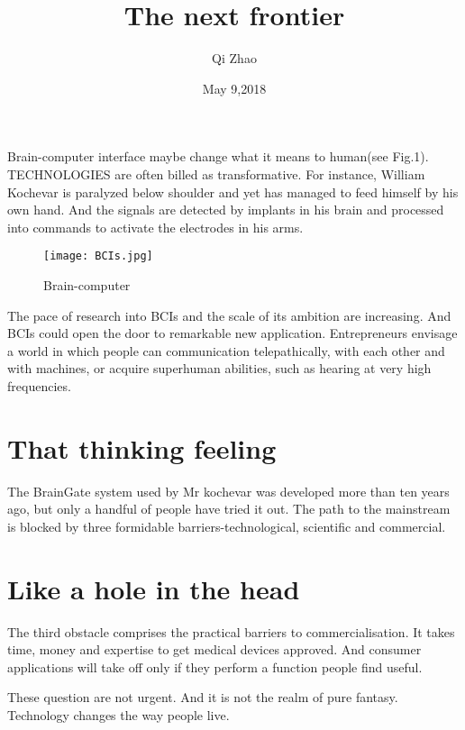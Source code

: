 \documentclass{article}
\author{Qi Zhao}
\date{May 9,2018}
\title{The next frontier}
\begin{document}
\maketitle
\par Brain-computer\cite{Wolpaw2000Brain} interface maybe change what it means to human(see Fig.{\color{red}1}). TECHNOLOGIES are often billed as transformative. For instance, William Kochevar is paralyzed below shoulder and yet has managed to feed himself by his own hand. And the signals are detected by implants in his brain and processed into commands to activate the electrodes in his arms.
\begin{figure}[htbp]
\centering
\texttt{[image: BCIs.jpg]}
\caption{Brain-computer}
\label{1}
\end{figure}
\par The pace of research into BCIs\cite{Beverina2003User} and the scale of its ambition are increasing. And BCIs could open the door to remarkable new application. Entrepreneurs envisage a world in which people can communication telepathically, with each other and with machines, or acquire superhuman abilities, such as hearing at very high frequencies.
\par
\section{That thinking feeling}
\par The BrainGate system\cite{Vogel2014Continuous} used by Mr kochevar was developed more than ten years ago, but only a handful of people have tried it out. The path to the mainstream is blocked by three formidable barriers-technological, scientific and commercial.
\par
\section{Like a hole in the head }
\par The third obstacle comprises the practical barriers to commercialisation. It takes time, money and expertise to get medical devices approved. And consumer applications will take off only if they perform a function people find useful.\\

\par These question are not urgent. And it is not the realm of pure fantasy. Technology changes the way people live.



\end{document}
